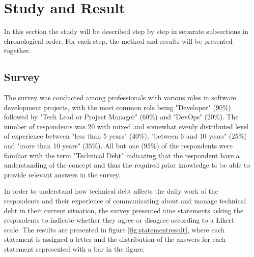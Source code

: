 

\section{Study and Result}
In this section the study will be described step by step in separate subsections in chronological order.
For each step, the method and results will be presented together.


\subsection{Survey}
The survey was conducted among professionals with various roles in software development projects, with the most common role being "Developer" (90\%) followed by "Tech Lead or Project Manager" (60\%) and "DevOps" (20\%).
The number of respondents was 20 with mixed and somewhat evenly distributed level of experience between "less than 5 years" (40\%), "between 6 and 10 years" (25\%) and "more than 10 years" (35\%).
All but one (95\%) of the respondents were familiar with the term "Technical Debt" indicating that the respondent have a understanding of the concept and thus the required prior knowledge to be able to provide relevant answers in the survey.

In order to understand how technical debt affects the daily work of the respondents and their experience of communicating about and manage technical debt in their current situation, the survey presented nine statements asking the respondents to indicate whether they agree or disagree according to a Likert scale. %
The results are presented in figure \ref{fig:statementresult}, where each statement is assigned a letter and the distribution of the answers for each statement represented with a bar in the figure.

